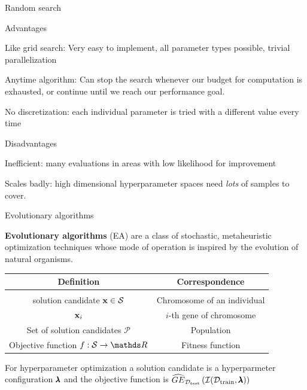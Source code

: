 \begin{frame}{Random search}
\framebreak

\begin{blocki}{Advantages}
\item Like grid search: Very easy to implement, all parameter types possible, trivial parallelization
\item Anytime algorithm: Can stop the search whenever our budget for computation is exhausted, or continue until we reach our performance goal.
\item No discretization: each individual parameter is tried with a different value every time
\end{blocki}

\begin{blocki}{Disadvantages}
\item Inefficient: many evaluations in areas with low likelihood for improvement
\item Scales badly: high dimensional hyperparameter spaces need \emph{lots} of samples to cover.
\end{blocki}
\end{frame}





\begin{frame}{Evolutionary algorithms}

\textbf{Evolutionary algorithms} (EA) are a class of stochastic, metaheuristic optimization techniques whose mode of operation is inspired by the evolution of natural organisms.

\vspace{0.5cm}

\begin{center}
\begin{tabular}{ c | c }
\textbf{Definition} & \textbf{Correspondence} \\[0.05cm]
\hline \\[0.01cm]
solution candidate $\mathbf{x}\in \mathcal{S}$ & Chromosome of an individual \\[0.1cm]
$\mathbf{x}_i$& $i$-th gene of chromosome\\[0.1cm]
Set of solution candidates $\mathcal{P}$ & Population \\[0.1cm]
Objective function $f: \mathcal{S} \to \R$ & Fitness function
\end{tabular}
\end{center}

For hyperparameter optimization a solution candidate is a hyperparmeter configuration $\pmb{\lambda}$ and the objective function is $\widehat{GE}_{\mathcal{D}_{\text{test}}}\left(\mathcal{I}(\mathcal{D}_{\text{train}}, \pmb{\lambda})\right)$

\end{frame}

